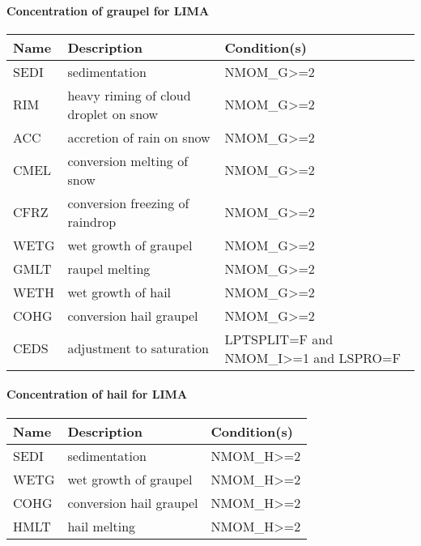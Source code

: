 \paragraph{Concentration of graupel for LIMA}
\mbox{} %

\begin{longtable} {|p{}|p{}|p{}|}
\hline
Name & Description & Condition(s) \\
\hline \hline
\endhead
SEDI   & sedimentation                                  & NMOM\_G>=2 \\\hline
RIM    & heavy riming of cloud droplet on snow          & NMOM\_G>=2 \\\hline
ACC    & accretion of rain on snow                      & NMOM\_G>=2 \\\hline
CMEL   & conversion melting of snow                     & NMOM\_G>=2 \\\hline
CFRZ   & conversion freezing of raindrop                & NMOM\_G>=2 \\\hline
WETG   & wet growth of graupel                          & NMOM\_G>=2 \\\hline
GMLT   & raupel melting                                 & NMOM\_G>=2 \\\hline
WETH   & wet growth of hail                             & NMOM\_G>=2 \\\hline
COHG   & conversion hail graupel                        & NMOM\_G>=2 \\\hline
CEDS   & adjustment to saturation                       & LPTSPLIT=F and NMOM\_I>=1 and LSPRO=F \\\hline
\end{longtable}

\paragraph{Concentration of hail for LIMA}
\mbox{} %

\begin{longtable} {|p{}|p{}|p{}|}
\hline
Name & Description & Condition(s) \\
\hline \hline
\endhead
SEDI   & sedimentation                                  & NMOM\_H>=2 \\\hline
WETG   & wet growth of graupel                          & NMOM\_H>=2 \\\hline
COHG   & conversion hail graupel                        & NMOM\_H>=2 \\\hline
HMLT   & hail melting                                   & NMOM\_H>=2 \\\hline
\end{longtable}


